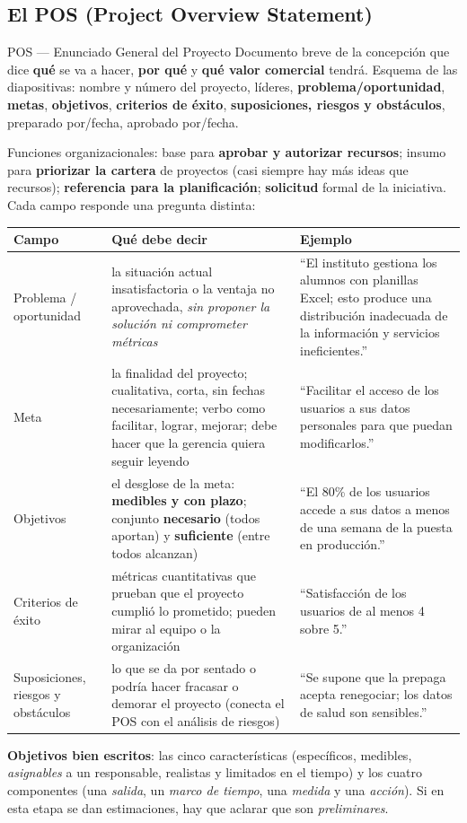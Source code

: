 \documentclass[11pt,a4paper]{article}
\begin{document}
\subsection{El POS (Project Overview Statement)}
\begin{defbox}{POS --- Enunciado General del Proyecto}
Documento breve de la concepción que dice \textbf{qué} se va a hacer, \textbf{por qué} y \textbf{qué valor
comercial} tendrá. Esquema de las diapositivas: nombre y número del proyecto, líderes, \textbf{problema/oportunidad},
\textbf{metas}, \textbf{objetivos}, \textbf{criterios de éxito}, \textbf{suposiciones, riesgos y
obstáculos}, preparado por/fecha, aprobado por/fecha.
\end{defbox}
Funciones organizacionales: base para \textbf{aprobar y autorizar recursos}; insumo para \textbf{priorizar la
cartera} de proyectos (casi siempre hay más ideas que recursos); \textbf{referencia para la planificación};
\textbf{solicitud} formal de la iniciativa. Cada campo responde una pregunta distinta:
\begin{center}\small
\begin{tabularx}{\textwidth}{@{}l X X@{}}
\toprule
\textbf{Campo} & \textbf{Qué debe decir} & \textbf{Ejemplo}\\
\midrule
Problema / oportunidad & la situación actual insatisfactoria o la ventaja no aprovechada, \emph{sin proponer la
solución ni comprometer métricas} & ``El instituto gestiona los alumnos con planillas Excel; esto produce una
distribución inadecuada de la información y servicios ineficientes.''\\
Meta & la finalidad del proyecto; cualitativa, corta, sin fechas necesariamente; verbo como facilitar, lograr,
mejorar; debe hacer que la gerencia quiera seguir leyendo & ``Facilitar el acceso de los usuarios a sus datos
personales para que puedan modificarlos.''\\
Objetivos & el desglose de la meta: \textbf{medibles y con plazo}; conjunto \textbf{necesario} (todos aportan)
y \textbf{suficiente} (entre todos alcanzan) & ``El 80\% de los usuarios accede a sus datos a menos de una
semana de la puesta en producción.''\\
Criterios de éxito & métricas cuantitativas que prueban que el proyecto cumplió lo prometido; pueden mirar al
equipo o la organización & ``Satisfacción de los usuarios de al menos 4 sobre 5.''\\
Suposiciones, riesgos y obstáculos & lo que se da por sentado o podría hacer fracasar o demorar el proyecto
(conecta el POS con el análisis de riesgos) & ``Se supone que la prepaga acepta renegociar; los datos de salud
son sensibles.''\\
\bottomrule
\end{tabularx}
\end{center}
\textbf{Objetivos bien escritos}: las cinco características (específicos, medibles, \emph{asignables} a un
responsable, realistas y limitados en el tiempo) y los cuatro componentes (una \emph{salida}, un \emph{marco de
tiempo}, una \emph{medida} y una \emph{acción}). Si en esta etapa se dan estimaciones, hay que aclarar que son
\emph{preliminares}.
\end{document}

